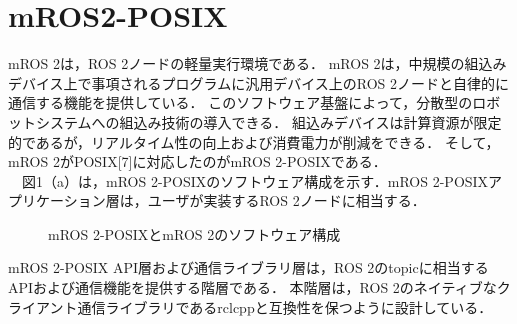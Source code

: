 \documentclass[11pt]{ujarticle}
\begin{document}
\section{mROS2-POSIX}
mROS 2は，ROS 2ノードの軽量実行環境である．
mROS 2は，中規模の組込みデバイス上で事項されるプログラムに汎用デバイス上のROS 2ノードと自律的に通信する機能を提供している．
このソフトウェア基盤によって，分散型のロボットシステムへの組込み技術の導入できる．
組込みデバイスは計算資源が限定的であるが，リアルタイム性の向上および消費電力が削減をできる．
そして，mROS 2がPOSIX[7]に対応したのがmROS 2-POSIXである．
\\　図1（a）は，mROS 2-POSIXのソフトウェア構成を示す．mROS 2-POSIXアプリケーション層は，ユーザが実装するROS 2ノードに相当する．
\begin{figure}[t]
	\centering
	\begin{minipage}{.5\textwidth}
		\centering
		\hfill
	\end{minipage}
	\caption{mROS 2-POSIXとmROS 2のソフトウェア構成}
	
\end{figure}
mROS 2-POSIX API層および通信ライブラリ層は，ROS 2のtopicに相当するAPIおよび通信機能を提供する階層である．
本階層は，ROS 2のネイティブなクライアント通信ライブラリであるrclcppと互換性を保つように設計している．
\end{document}
